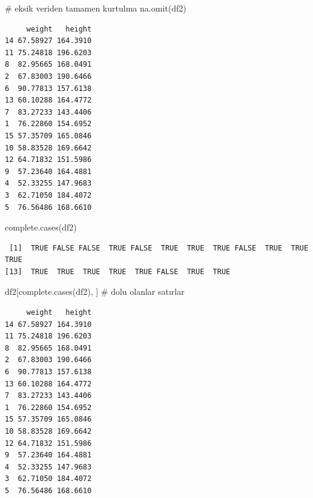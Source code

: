\documentclass[
  letterpaper,
  DIV=11,
  numbers=noendperiod]{scrreprt}
\newenvironment{Shaded}{\begin{snugshade}}{\end{snugshade}}
\newcommand{\CommentTok}[1]{\textcolor[rgb]{0.37,0.37,0.37}{#1}}
\newcommand{\FunctionTok}[1]{\textcolor[rgb]{0.28,0.35,0.67}{#1}}
\newcommand{\NormalTok}[1]{\textcolor[rgb]{0.00,0.23,0.31}{#1}}
\newcommand{\SpecialCharTok}[1]{\textcolor[rgb]{0.37,0.37,0.37}{#1}}
\begin{document}
\begin{Shaded}
\begin{Highlighting}[]
\CommentTok{\# eksik veriden tamamen kurtulma}
\FunctionTok{na.omit}\NormalTok{(df2)}
\end{Highlighting}
\end{Shaded}

\begin{verbatim}
     weight   height
14 67.58927 164.3910
11 75.24818 196.6203
8  82.95665 168.0491
2  67.83003 190.6466
6  90.77813 157.6138
13 60.10288 164.4772
7  83.27233 143.4406
1  76.22860 154.6952
15 57.35709 165.0846
10 58.83528 169.6642
12 64.71832 151.5986
9  57.23640 164.4881
4  52.33255 147.9683
3  62.71050 184.4072
5  76.56486 168.6610
\end{verbatim}

\begin{Shaded}
\begin{Highlighting}[]
\FunctionTok{complete.cases}\NormalTok{(df2)}
\end{Highlighting}
\end{Shaded}

\begin{verbatim}
 [1]  TRUE FALSE FALSE  TRUE FALSE  TRUE  TRUE  TRUE FALSE  TRUE  TRUE  TRUE
[13]  TRUE  TRUE  TRUE  TRUE  TRUE FALSE  TRUE  TRUE
\end{verbatim}

\begin{Shaded}
\begin{Highlighting}[]
\NormalTok{df2[}\FunctionTok{complete.cases}\NormalTok{(df2), ] }\CommentTok{\# dolu olanlar satırlar}
\end{Highlighting}
\end{Shaded}

\begin{verbatim}
     weight   height
14 67.58927 164.3910
11 75.24818 196.6203
8  82.95665 168.0491
2  67.83003 190.6466
6  90.77813 157.6138
13 60.10288 164.4772
7  83.27233 143.4406
1  76.22860 154.6952
15 57.35709 165.0846
10 58.83528 169.6642
12 64.71832 151.5986
9  57.23640 164.4881
4  52.33255 147.9683
3  62.71050 184.4072
5  76.56486 168.6610
\end{verbatim}

\begin{Shaded}
\end{Shaded}
\end{document}
